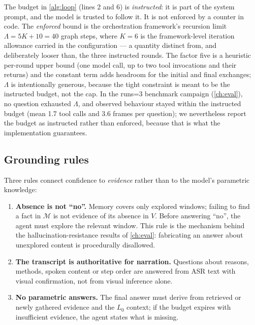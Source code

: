 The budget in \cref{alg:loop} (lines 2 and 6) is \emph{instructed}: it is part of the system prompt, and
the model is trusted to follow it. It is not enforced by a counter in code. The \emph{enforced}
bound is the orchestration framework's recursion limit $\Lambda = 5K + 10 = 40$ graph steps,
where $K = 6$ is the framework-level iteration allowance carried in the configuration --- a
quantity distinct from, and deliberately looser than, the three instructed rounds. The factor
five is a heuristic per-round upper bound (one model call, up to two tool invocations and their
returns) and the constant term adds headroom for the initial and final exchanges; $\Lambda$ is
intentionally generous, because the tight constraint is meant to be the instructed budget, not
the cap. In the runs=3 benchmark campaign (\cref{ch:eval}), no question exhausted
$\Lambda$, and observed behaviour stayed within the instructed budget (mean 1.7 tool calls and
3.6 frames per question); we nevertheless report the budget as instructed rather than enforced,
because that is what the implementation guarantees.

\subsection{Grounding rules}
\label{subsec:grounding}

Three rules connect confidence to \emph{evidence} rather than to the model's parametric knowledge:

\begin{enumerate}
  \item \textbf{Absence is not ``no''.} Memory covers only explored windows; failing to find a fact in
  $\mathcal{M}$ is not evidence of its absence in $V$. Before answering ``no'', the agent must
  explore the relevant window. This rule is the mechanism behind the hallucination-resistance
  results of \cref{ch:eval}: fabricating an answer about unexplored content is procedurally disallowed.
  \item \textbf{The transcript is authoritative for narration.} Questions about reasons, methods, spoken
  content or step order are answered from ASR text with visual confirmation, not from visual
  inference alone.
  \item \textbf{No parametric answers.} The final answer must derive from retrieved or newly gathered
  evidence and the $L_0$ context; if the budget expires with insufficient evidence, the agent
  states what is missing.
\end{enumerate}

